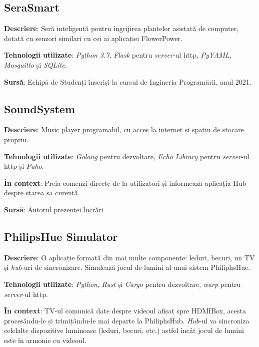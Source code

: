 \subsection*{SeraSmart}

\textbf{Descriere}: Seră inteligentă pentru îngrijirea plantelor asistată de computer, dotată cu senzori similari cu cei ai aplicației FlowerPower.

\textbf{Tehnologii utilizate}: \textit{Python 3.7}, \textit{Flask} pentru \textit{server}-ul \acrshort{http}, \textit{PyYAML}, \textit{Mosquitto} și \textit{SQLite}.

\textbf{Sursă}: Echipă de Studenți înscriși la cursul de Ingineria Programării, anul 2021.

\subsection*{SoundSystem}

\textbf{Descriere}: Music player programabil, cu acces la internet și spațiu de stocare propriu.

\textbf{Tehnologii utilizate}: \textit{Golang} pentru dezvoltare, \textit{Echo Library} pentru \textit{server}-ul \acrshort{http} și \textit{Paho}.

\textbf{În context}: Preia comenzi directe de la utilizatori și informează aplicația Hub despre starea sa curentă.

\textbf{Sursă}: Autorul prezentei lucrări

\subsection*{PhilipsHue Simulator}

\textbf{Descriere}: O aplicație formată din mai multe componente: leduri, becuri, un TV și \textit{hub}-uri de sincronizare. Simulează jocul de lumini al unui sistem PhiliphsHue.

\textbf{Tehnologii utilizate}: \textit{Python}, \textit{Rust} și \textit{Cargo} pentru dezvoltare, \textit{warp} pentru \textit{server}-ul \acrshort{http}.

\textbf{În context}: TV-ul comunică date despre videoul afișat spre HDMIBox, acesta procesându-le și trimițându-le mai departe la PhiliphsHub. \textit{Hub}-ul va sincroniza celelalte dispozitive luminoase (leduri, becuri, etc.) astfel încât jocul de lumini este în armonie cu videoul.

